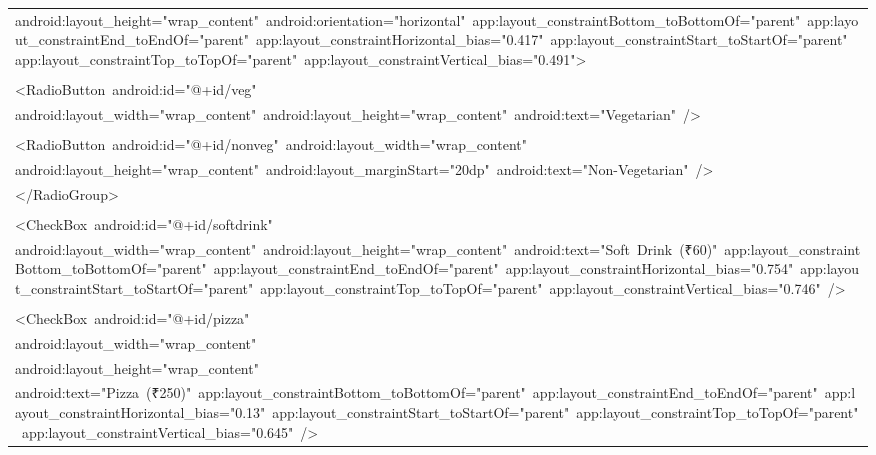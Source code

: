 \documentclass[a4paper,12pt]{article}
\begin{document}
\begin{longtable}{|p{}|}
{\ttfamily\small android:layout\_height="wrap\_content"\ android:orientation="horizontal"\ app:layout\_constraintBottom\_toBottomOf="parent"\ app:layout\_constraintEnd\_toEndOf="parent"\ app:layout\_constraintHorizontal\_bias="0.417"\ app:layout\_constraintStart\_toStartOf="parent"\ app:layout\_constraintTop\_toTopOf="parent"\ app:layout\_constraintVertical\_bias="0.491"\textgreater{}} \\
\strut \\
{\ttfamily\small \textless{}RadioButton\ android:id="@+id/veg"} \\
{\ttfamily\small android:layout\_width="wrap\_content"\ android:layout\_height="wrap\_content"\ android:text="Vegetarian"\ /\textgreater{}} \\
\strut \\
{\ttfamily\small \textless{}RadioButton\ android:id="@+id/nonveg"\ android:layout\_width="wrap\_content"} \\
{\ttfamily\small android:layout\_height="wrap\_content"\ android:layout\_marginStart="20dp"\ android:text="Non-Vegetarian"\ /\textgreater{}} \\
{\ttfamily\small \textless{}/RadioGroup\textgreater{}} \\
\strut \\
{\ttfamily\small \textless{}CheckBox\ android:id="@+id/softdrink"} \\
{\ttfamily\small android:layout\_width="wrap\_content"\ android:layout\_height="wrap\_content"\ android:text="Soft\ Drink\ (₹60)"\ app:layout\_constraintBottom\_toBottomOf="parent"\ app:layout\_constraintEnd\_toEndOf="parent"\ app:layout\_constraintHorizontal\_bias="0.754"\ app:layout\_constraintStart\_toStartOf="parent"\ app:layout\_constraintTop\_toTopOf="parent"\ app:layout\_constraintVertical\_bias="0.746"\ /\textgreater{}} \\
\strut \\
{\ttfamily\small \textless{}CheckBox\ android:id="@+id/pizza"} \\
{\ttfamily\small android:layout\_width="wrap\_content"} \\
{\ttfamily\small android:layout\_height="wrap\_content"} \\
{\ttfamily\small android:text="Pizza\ (₹250)"\ app:layout\_constraintBottom\_toBottomOf="parent"\ app:layout\_constraintEnd\_toEndOf="parent"\ app:layout\_constraintHorizontal\_bias="0.13"\ app:layout\_constraintStart\_toStartOf="parent"\ app:layout\_constraintTop\_toTopOf="parent"\ app:layout\_constraintVertical\_bias="0.645"\ /\textgreater{}} \\

\end{longtable}
\end{document}
